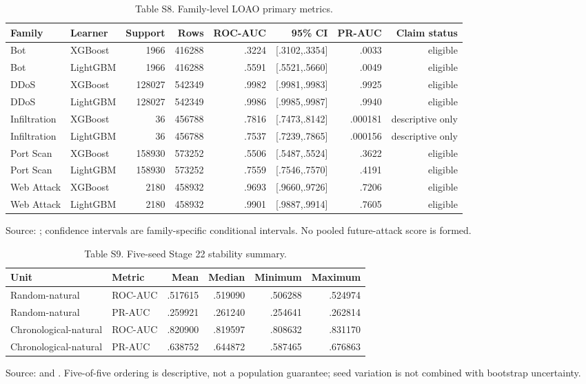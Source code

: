 \documentclass[preprint,12pt]{elsarticle}
\begin{document}
\begin{table}[htbp]
\centering\tiny
\caption{Table S8. Family-level LOAO primary metrics.}
\begin{tabular}{@{}llrrrrrr@{}}
\toprule
Family & Learner & Support & Rows & ROC-AUC & 95\% CI & PR-AUC & Claim status\\
\midrule
Bot & XGBoost & 1966 & 416288 & .3224 & [.3102,.3354] & .0033 & eligible\\
Bot & LightGBM & 1966 & 416288 & .5591 & [.5521,.5660] & .0049 & eligible\\
DDoS & XGBoost & 128027 & 542349 & .9982 & [.9981,.9983] & .9925 & eligible\\
DDoS & LightGBM & 128027 & 542349 & .9986 & [.9985,.9987] & .9940 & eligible\\
Infiltration & XGBoost & 36 & 456788 & .7816 & [.7473,.8142] & .000181 & descriptive only\\
Infiltration & LightGBM & 36 & 456788 & .7537 & [.7239,.7865] & .000156 & descriptive only\\
Port Scan & XGBoost & 158930 & 573252 & .5506 & [.5487,.5524] & .3622 & eligible\\
Port Scan & LightGBM & 158930 & 573252 & .7559 & [.7546,.7570] & .4191 & eligible\\
Web Attack & XGBoost & 2180 & 458932 & .9693 & [.9660,.9726] & .7206 & eligible\\
Web Attack & LightGBM & 2180 & 458932 & .9901 & [.9887,.9914] & .7605 & eligible\\
\bottomrule
\end{tabular}
\end{table}
Source: ; confidence intervals are family-specific conditional intervals. No pooled future-attack score is formed.

\begin{table}[htbp]
\centering\scriptsize
\caption{Table S9. Five-seed Stage 22 stability summary.}
\begin{tabular}{@{}llrrrr@{}}
\toprule
Unit & Metric & Mean & Median & Minimum & Maximum\\
\midrule
Random-natural & ROC-AUC & .517615 & .519090 & .506288 & .524974\\
Random-natural & PR-AUC & .259921 & .261240 & .254641 & .262814\\
Chronological-natural & ROC-AUC & .820900 & .819597 & .808632 & .831170\\
Chronological-natural & PR-AUC & .638752 & .644872 & .587465 & .676863\\
\bottomrule
\end{tabular}
\end{table}
Source:  and . Five-of-five ordering is descriptive, not a population guarantee; seed variation is not combined with bootstrap uncertainty.
\end{document}

